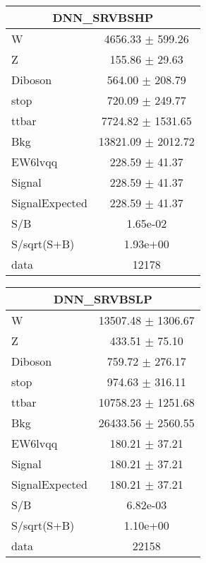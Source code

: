 \begin{table}
\centering
\small
\begin{tabular}{|l|c|}
\hline
\multicolumn{2}{|c|}{DNN\_SRVBSHP} \\ \hline
W & 4656.33 $\pm$ 599.26\\
Z & 155.86 $\pm$ 29.63\\
Diboson & 564.00 $\pm$ 208.79\\
stop & 720.09 $\pm$ 249.77\\
ttbar & 7724.82 $\pm$ 1531.65\\
\hline
Bkg & 13821.09 $\pm$ 2012.72\\
\hline
EW6lvqq & 228.59 $\pm$ 41.37\\
\hline
Signal & 228.59 $\pm$ 41.37\\
SignalExpected & 228.59 $\pm$ 41.37\\
\hline
S/B & 1.65e-02\\
S/sqrt(S+B) & 1.93e+00\\
\hline
data & 12178\\ \hline
\end{tabular}
\begin{tabular}{|l|c|}
\hline
 \multicolumn{2}{|c|}{DNN\_SRVBSLP}\\ \hline
W & 13507.48 $\pm$ 1306.67\\
Z & 433.51 $\pm$ 75.10\\
Diboson & 759.72 $\pm$ 276.17\\
stop & 974.63 $\pm$ 316.11\\
ttbar & 10758.23 $\pm$ 1251.68\\
\hline
Bkg & 26433.56 $\pm$ 2560.55\\
\hline
EW6lvqq & 180.21 $\pm$ 37.21\\
\hline
Signal & 180.21 $\pm$ 37.21\\
SignalExpected & 180.21 $\pm$ 37.21\\
\hline
S/B & 6.82e-03\\
S/sqrt(S+B) & 1.10e+00\\
\hline
data & 22158\\ \hline
\end{tabular}

\end{table}
